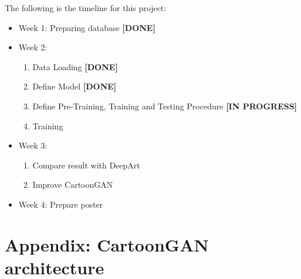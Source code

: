 \documentclass{article}
\begin{document}
The following is the timeline for this project:
\begin{itemize}
  \item Week 1: Preparing database \textbf{[DONE]}
  \item Week 2:
    \begin{enumerate}
      \item Data Loading \textbf{[DONE]}
      \item Define Model \textbf{[DONE]}
      \item Define Pre-Training, Training and Testing Procedure \textbf{[IN PROGRESS]}
      \item Training
    \end{enumerate}
  \item Week 3:
    \begin{enumerate}
      \item Compare result with DeepArt
      \item Improve CartoonGAN
    \end{enumerate}
  \item Week 4: Prepare poster
\end{itemize}


\medskip

\newpage
\section*{Appendix: CartoonGAN architecture}
\end{document}
